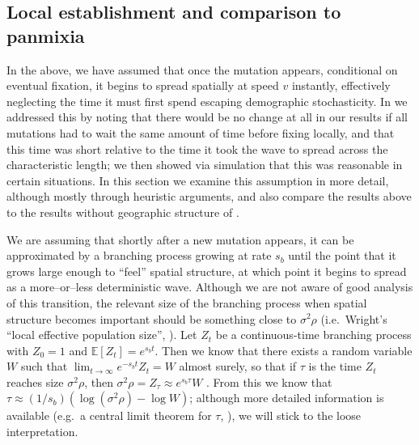 \documentclass{article}
\newcommand{\E}{\mathbb{E}}
\begin{document}




\subsection{Local establishment and comparison to panmixia}

In the above, we have assumed that once the mutation appears,
conditional on eventual fixation, it begins to spread spatially at speed $v$ instantly,
effectively neglecting the time it must first spend escaping demographic stochasticity.
In \citet{ralphcoop2010} we addressed this by noting that there would be no change at all in our results 
if all mutations had to wait the same amount of time before fixing locally,
and that this time was short relative to the time it took the wave to spread across the characteristic length;
we then showed via simulation that this was reasonable in certain situations.
In this section we examine this assumption in more detail, although mostly through heuristic arguments,
and also compare the results above to the results without geographic structure of \citet{softsweepsII}.

We are assuming that shortly after a new mutation appears, 
it can be approximated by a branching process growing at rate $s_b$
until the point that it grows large enough to ``feel'' spatial structure,
at which point it begins to spread as a more--or--less deterministic wave.
Although we are not aware of good analysis of this transition, 
the relevant size of the branching process when spatial structure becomes important
should be something close to $\sigma^2 \rho$ 
(i.e.\ Wright's ``local effective population size'', \citet{Wright:43}).
Let $Z_t$ be a continuous-time branching process with $Z_0=1$ and $\E[Z_t] = e^{s_b t}$.
Then we know that there exists a random variable $W$ such that $\lim_{t\to\infty} e^{-s_b t} Z_t = W$ almost surely,
so that if $\tau$ is the time $Z_t$ reaches size $\sigma^2 \rho$, %
then $\sigma^2 \rho = Z_\tau \approx e^{s_b \tau} W$ \citep{jagers1975branching}.
From this we know that $\tau \approx (1/s_b) (\log (\sigma^2 \rho) - \log W)$;
although more detailed information is available (e.g.\ a central limit theorem for $\tau$, \citet{nagaev1971limit}),
we will stick to the loose interpretation.
\end{document}

